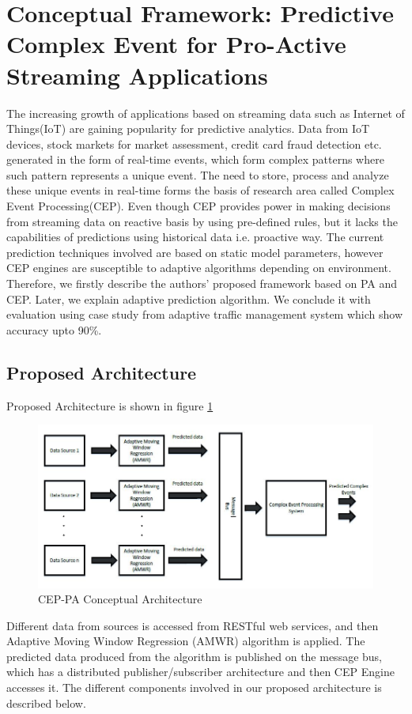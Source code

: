 \documentclass[runningheads]{llncs}
\begin{document}
\section{Conceptual Framework: Predictive Complex Event for Pro-Active Streaming Applications}
The increasing growth of applications based on streaming data such as Internet of Things(IoT) are gaining popularity for predictive analytics. Data from IoT devices, stock markets for market assessment, credit card fraud detection etc. generated in the form of real-time events, which form complex patterns where such pattern represents a unique event. The need to store, process and analyze these unique events in real-time forms the basis of research area called Complex Event Processing(CEP).
Even though CEP provides power in making decisions from streaming data on reactive basis by using pre-defined rules, but it lacks the capabilities of predictions using historical data i.e. proactive way. The current prediction techniques involved are based on static model parameters, however CEP engines are susceptible to adaptive algorithms depending on environment. Therefore, we firstly describe the authors' proposed framework based on PA and CEP. Later, we explain adaptive prediction algorithm. We conclude it with evaluation using case study from adaptive traffic management system which show accuracy upto 90\%.
 
\subsection{Proposed Architecture}Proposed Architecture is shown in figure \ref{fig:figure12}
\begin{figure}
	\centering
	\includegraphics[width=0.8\linewidth]{Figure13.jpg}
	\caption{CEP-PA Conceptual Architecture \cite{17}}
	\label{fig:figure12}
\end{figure}
Different data from sources is accessed from RESTful web services, and then Adaptive Moving Window Regression (AMWR) algorithm is applied. The predicted data produced from the algorithm is published on the message bus, which has a distributed publisher/subscriber architecture and then CEP Engine accesses it.
The different components involved in our proposed architecture is described below.
\end{document}
